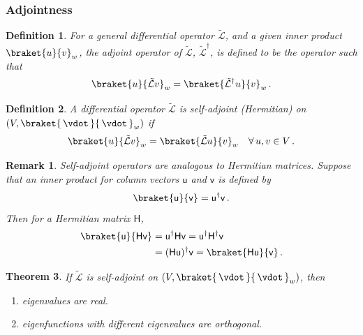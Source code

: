 \documentclass{article}
\theoremstyle{plain}\theoremheaderfont{\normalfont\itshape}\theorembodyfont{\rmfamily}\theoremseparator{.}\newtheorem*{rem}{Remark}\newtheorem*{ex}{Example}\newtheorem*{proof}{Proof}\newtheorem*{altp}{Alternative proof}
\theoremstyle{plain}\theoremheaderfont{\normalfont\bfseries}\theorembodyfont{\rmfamily}\theoremseparator{.}\newtheorem{thm}{Theorem}[section]\newtheorem{lem}[thm]{Lemma}\newtheorem{prop}[thm]{Proposition}\newtheorem*{cor}{Corollary}\newtheorem{defn}[thm]{Definition}\newtheorem{clm}[thm]{Claim}\newtheorem{clminproof}{Claim}
\theoremstyle{break}\theoremheaderfont{\normalfont\itshape}\theorembodyfont{\rmfamily}\theoremseparator{.\medskip}\newtheorem*{proofskip}{Proof}\newtheorem*{exs}{Examples}\newtheorem*{rems}{Remarks}
\theoremstyle{break}\theoremheaderfont{\normalfont\bfseries}\theorembodyfont{\rmfamily}\theoremseparator{.\medskip}\newtheorem{lemskip}[thm]{Lemma}\newtheorem{defnskip}[thm]{Definition}\newtheorem{propskip}[thm]{Proposition}\newtheorem{thmskip}[thm]{Theorem}
\numberwithin{equation}{section}
\begin{document}
	\subsubsection{Adjointness}
	\begin{defn}
		For a general differential operator \(\tilde{\mathcal{L}}\), and a given inner product \(\braket{u}{v}_w\), the \textit{adjoint operator} of \(\tilde{\mathcal{L}}\), \(\tilde{\mathcal{L}}^\dagger\), is defined to be the operator such that
		\[\braket{u}{\tilde{\mathcal{L}}v}_w=\braket{\tilde{\mathcal{L}}^\dagger u}{v}_w\,.\]
	\end{defn}
	\begin{defn}
		A differential operator \(\tilde{\mathcal{L}}\) is \textit{self-adjoint} (\textit{Hermitian}) on \((V,\braket{\,\vdot\,}{\,\vdot\,}_w)\) if
		\[\braket{u}{\tilde{\mathcal{L}}v}_w=\braket{\tilde{\mathcal{L}}u}{v}_w\quad\forall\, u,v\in V\,.\]
	\end{defn}
	\begin{rem}
		Self-adjoint operators are analogous to Hermitian matrices. Suppose that an inner product for column vectors \(\mathsf{u}\) and \(\mathsf{v}\) is defined by
		\[\braket{\mathsf{u}}{\mathsf{v}}=\mathsf{u}^\dagger\mathsf{v}\,.\]
		Then for a Hermitian matrix \(\mathsf{H}\),
		\begin{align*}
			\braket{\mathsf{u}}{\mathsf{Hv}}&=\mathsf{u^\dagger Hv}=\mathsf{u^\dagger H^\dagger v}\\
			&=\mathsf{(Hu)^\dagger v}=\braket{\mathsf{Hu}}{\mathsf{v}}\,.
		\end{align*}
	\end{rem}
	\begin{thm}
		If \(\tilde{\mathcal{L}}\) is self-adjoint on \((V,\braket{\,\vdot\,}{\,\vdot\,}_w)\), then
		\begin{enumerate}[topsep=0pt]
			\item[(i)] eigenvalues are real.
			\item[(ii)] eigenfunctions with different eigenvalues are orthogonal.
		\end{enumerate}
	\end{thm}
\end{document}
